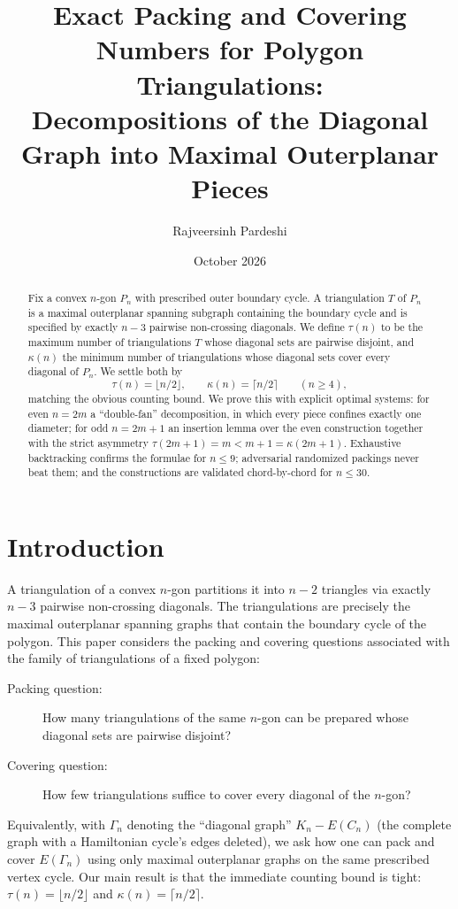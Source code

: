 \documentclass[11pt,a4paper]{article}
\title{Exact Packing and Covering Numbers for Polygon Triangulations:\\
       Decompositions of the Diagonal Graph into Maximal Outerplanar Pieces}
\author{Rajveersinh Pardeshi}
\date{October 2026}
\begin{document}
\maketitle

\begin{abstract}
Fix a convex $n$-gon $P_n$ with prescribed outer boundary cycle. A triangulation
$T$ of $P_n$ is a maximal outerplanar spanning subgraph containing the boundary
cycle and is specified by exactly $n-3$ pairwise non-crossing diagonals. We
define $\tau(n)$ to be the maximum number of triangulations $T$ whose diagonal
sets are pairwise disjoint, and $\kappa(n)$ the minimum number of triangulations
whose diagonal sets cover every diagonal of $P_n$. We settle both by
\[
\tau(n)=\lfloor n/2\rfloor, \qquad \kappa(n)=\lceil n/2\rceil \qquad (n\ge 4),
\]
matching the obvious counting bound. We prove this with explicit optimal
systems: for even $n=2m$ a ``double-fan'' decomposition, in which every piece
confines exactly one diameter; for odd $n=2m+1$ an insertion lemma over the even
construction together with the strict asymmetry
$\tau(2m+1)=m<m+1=\kappa(2m+1)$. Exhaustive backtracking confirms the formulae
for $n\le 9$; adversarial randomized packings never beat them; and the
constructions are validated chord-by-chord for $n\le 30$.
\end{abstract}

\section{Introduction}

A triangulation of a convex $n$-gon partitions it into $n-2$ triangles via
exactly $n-3$ pairwise non-crossing diagonals. The triangulations are precisely
the maximal outerplanar spanning graphs that contain the boundary cycle of the
polygon. This paper considers the packing and covering questions associated with the
family of triangulations of a fixed polygon:

\begin{description}
\item[Packing question:] How many triangulations of the same $n$-gon can be
prepared whose diagonal sets are pairwise disjoint?
\item[Covering question:] How few triangulations suffice to cover every
diagonal of the $n$-gon?
\end{description}

Equivalently, with $\Gamma_n$ denoting the ``diagonal graph''
$K_n - E(C_n)$ (the complete graph with a Hamiltonian cycle's edges deleted),
we ask how one can pack and cover $E(\Gamma_n)$ using only maximal outerplanar
graphs on the same prescribed vertex cycle. Our main result is that the
immediate counting bound is tight: $\tau(n)=\lfloor n/2\rfloor$ and
$\kappa(n)=\lceil n/2\rceil$.
\end{document}

